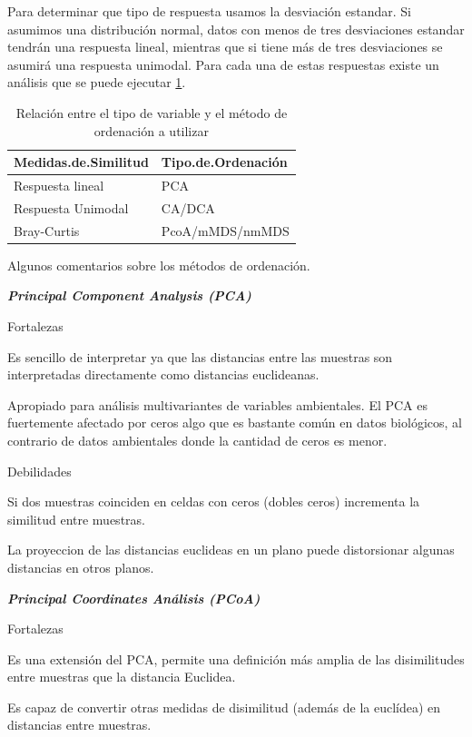 \documentclass[]{book}
\begin{document}
Para determinar que tipo de respuesta usamos la desviación estandar. Si
asumimos una distribución normal, datos con menos de tres desviaciones
estandar tendrán una respuesta lineal, mientras que si tiene más de tres
desviaciones se asumirá una respuesta unimodal. Para cada una de estas
respuestas existe un análisis que se puede ejecutar
\ref{tab:ordenacion}.

\begin{table}

\caption{\label{tab:ordenacion}Relación entre el tipo de variable y el método de ordenación a utilizar}
\centering
\begin{tabular}[t]{ll}
\toprule
Medidas.de.Similitud & Tipo.de.Ordenación\\
\midrule
Respuesta lineal & PCA\\
Respuesta Unimodal & CA/DCA\\
Bray-Curtis & PcoA/mMDS/nmMDS\\
\bottomrule
\end{tabular}
\end{table}

Algunos comentarios sobre los métodos de ordenación.

\textbf{\emph{Principal Component Analysis (PCA)}}

Fortalezas

Es sencillo de interpretar ya que las distancias entre las muestras son
interpretadas directamente como distancias euclideanas.

Apropiado para análisis multivariantes de variables ambientales. El PCA
es fuertemente afectado por ceros algo que es bastante común en datos
biológicos, al contrario de datos ambientales donde la cantidad de ceros
es menor.

Debilidades

Si dos muestras coinciden en celdas con ceros (dobles ceros) incrementa
la similitud entre muestras.

La proyeccion de las distancias euclideas en un plano puede distorsionar
algunas distancias en otros planos.

\textbf{\emph{Principal Coordinates Análisis (PCoA)}}

Fortalezas

Es una extensión del PCA, permite una definición más amplia de las
disimilitudes entre muestras que la distancia Euclidea.

Es capaz de convertir otras medidas de disimilitud (además de la
euclídea) en distancias entre muestras.
\end{document}
